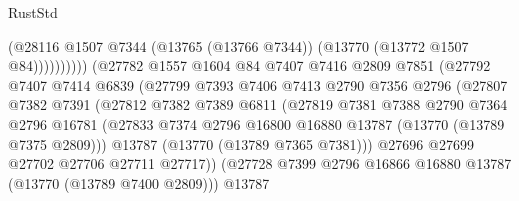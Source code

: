 \begin{lexlean}{RustStd}
\begin{coremodule}
                                        (@28116
                                          @1507
                                          @7344
                                          (@13765 (@13766 @7344))
                                          (@13770 (@13772 @1507 @84))))))))))
                          (@27782
                            @1557
                            @1604
                            @84
                            @7407
                            @7416
                            @2809
                            @7851
                            (@27792
                              @7407
                              @7414
                              @6839
                              (@27799
                                @7393
                                @7406
                                @7413
                                @2790
                                @7356
                                @2796
                                (@27807
                                  @7382
                                  @7391
                                  (@27812
                                    @7382
                                    @7389
                                    @6811
                                    (@27819
                                      @7381
                                      @7388
                                      @2790
                                      @7364
                                      @2796
                                      @16781
                                      (@27833
                                        @7374
                                        @2796
                                        @16800
                                        @16880
                                        @13787
                                        (@13770 (@13789 @7375 @2809)))
                                      @13787
                                      (@13770 (@13789 @7365 @7381)))
                                    @27696
                                    @27699
                                    @27702
                                    @27706
                                    @27711
                                    @27717))
                                (@27728
                                  @7399
                                  @2796
                                  @16866
                                  @16880
                                  @13787
                                  (@13770 (@13789 @7400 @2809)))
                                @13787

\end{coremodule}
\end{lexlean}
